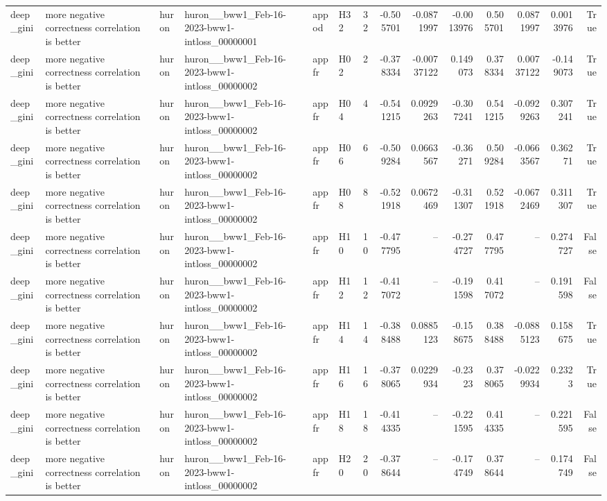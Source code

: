 \begin{longtable}{llllllrrrrrrrr}
deep\_gini & more negative correctness correlation is better & huron & huron\_\_bww1\_Feb-16-2023-bww1-intloss\_00000001 & appod & H32 & 32 & -0.505701 & -0.0871997 & -0.0013976 & 0.505701 & 0.0871997 & 0.0013976 & True \\
deep\_gini & more negative correctness correlation is better & huron & huron\_\_bww1\_Feb-16-2023-bww1-intloss\_00000002 & appfr & H02 & 2 & -0.378334 & -0.00737122 & 0.149073 & 0.378334 & 0.00737122 & -0.149073 & True \\
deep\_gini & more negative correctness correlation is better & huron & huron\_\_bww1\_Feb-16-2023-bww1-intloss\_00000002 & appfr & H04 & 4 & -0.541215 & 0.0929263 & -0.307241 & 0.541215 & -0.0929263 & 0.307241 & True \\
deep\_gini & more negative correctness correlation is better & huron & huron\_\_bww1\_Feb-16-2023-bww1-intloss\_00000002 & appfr & H06 & 6 & -0.509284 & 0.0663567 & -0.36271 & 0.509284 & -0.0663567 & 0.36271 & True \\
deep\_gini & more negative correctness correlation is better & huron & huron\_\_bww1\_Feb-16-2023-bww1-intloss\_00000002 & appfr & H08 & 8 & -0.521918 & 0.0672469 & -0.311307 & 0.521918 & -0.0672469 & 0.311307 & True \\
deep\_gini & more negative correctness correlation is better & huron & huron\_\_bww1\_Feb-16-2023-bww1-intloss\_00000002 & appfr & H10 & 10 & -0.477795 & -- & -0.274727 & 0.477795 & -- & 0.274727 & False \\
deep\_gini & more negative correctness correlation is better & huron & huron\_\_bww1\_Feb-16-2023-bww1-intloss\_00000002 & appfr & H12 & 12 & -0.417072 & -- & -0.191598 & 0.417072 & -- & 0.191598 & False \\
deep\_gini & more negative correctness correlation is better & huron & huron\_\_bww1\_Feb-16-2023-bww1-intloss\_00000002 & appfr & H14 & 14 & -0.388488 & 0.0885123 & -0.158675 & 0.388488 & -0.0885123 & 0.158675 & True \\
deep\_gini & more negative correctness correlation is better & huron & huron\_\_bww1\_Feb-16-2023-bww1-intloss\_00000002 & appfr & H16 & 16 & -0.378065 & 0.0229934 & -0.2323 & 0.378065 & -0.0229934 & 0.2323 & True \\
deep\_gini & more negative correctness correlation is better & huron & huron\_\_bww1\_Feb-16-2023-bww1-intloss\_00000002 & appfr & H18 & 18 & -0.414335 & -- & -0.221595 & 0.414335 & -- & 0.221595 & False \\
deep\_gini & more negative correctness correlation is better & huron & huron\_\_bww1\_Feb-16-2023-bww1-intloss\_00000002 & appfr & H20 & 20 & -0.378644 & -- & -0.174749 & 0.378644 & -- & 0.174749 & False \\

\end{longtable}
